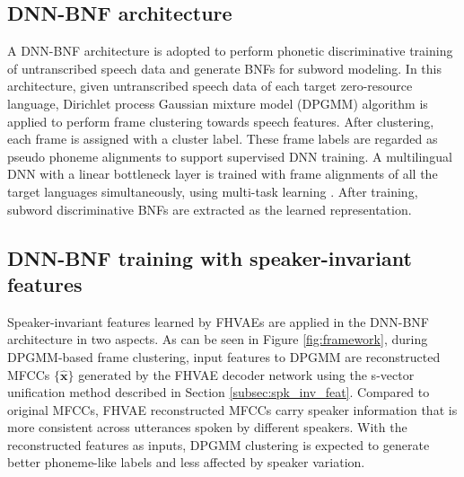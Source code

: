 \documentclass[a4paper]{article}
\begin{document}
\subsection{DNN-BNF architecture}
A DNN-BNF architecture  \cite{chen2017multilingual,Feng2018exploiting} is adopted to perform  phonetic discriminative training of untranscribed speech data and generate BNFs for subword modeling. 
In this  architecture, given untranscribed speech data of each target zero-resource language, Dirichlet process Gaussian mixture model (DPGMM) \cite{chang2013parallel} algorithm is applied to perform frame clustering towards speech features. After clustering, each frame is assigned with a cluster label. These frame labels  are regarded as pseudo phoneme alignments to support supervised DNN training. A multilingual DNN with a linear bottleneck layer is trained with frame alignments  of all the target languages simultaneously, using multi-task learning  \cite{caruana1998multitask}. After training, subword discriminative BNFs are extracted as the learned representation.

\subsection{DNN-BNF training with speaker-invariant features}
Speaker-invariant features learned by FHVAEs are applied  in the DNN-BNF architecture 
in two aspects.
As can be seen in Figure \ref{fig:framework}, during DPGMM-based frame clustering,  input features to DPGMM are reconstructed MFCCs $\{\bm{\hat{x}}\}$ generated by the FHVAE decoder network using the s-vector unification method described in Section 
\ref{subsec:spk_inv_feat}. Compared to original MFCCs, FHVAE reconstructed MFCCs  carry speaker information that is more consistent across utterances spoken by different speakers. With the reconstructed features as inputs, DPGMM clustering is expected to  generate better phoneme-like labels and less affected by speaker variation. 
\end{document}
